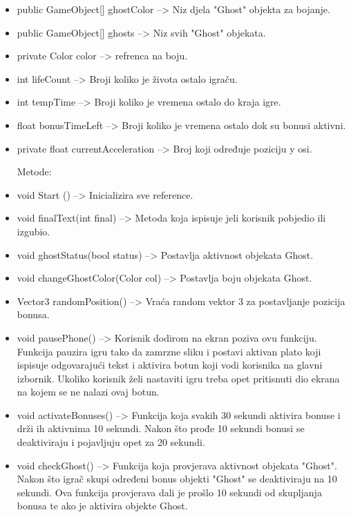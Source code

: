 \begin{itemize}
\item public GameObject[] ghostColor --> Niz djela "Ghost" objekta za bojanje.

\item public GameObject[] ghosts --> Niz svih "Ghost" objekata.
\item private Color color --> refrenca na boju.

\item int lifeCount --> Broji koliko je života ostalo igraču.

\item int tempTime --> Broji koliko je vremena ostalo do kraja igre.

\item float bonusTimeLeft --> Broji koliko je vremena ostalo dok su bonusi aktivni.

\item private float currentAcceleration --> Broj koji određuje poziciju y osi.

Metode:


\item void Start () --> Inicializira sve reference.

\item void finalText(int final) --> Metoda koja ispisuje jeli korisnik pobjedio ili izgubio.

\item void ghostStatus(bool status) --> Postavlja aktivnost objekata Ghost.

\item void changeGhostColor(Color col) --> Postavlja boju objekata Ghost.

\item Vector3 randomPosition() --> Vraća random vektor 3 za postavljanje pozicija bonusa.

\item void pausePhone() --> Korisnik dodirom na ekran poziva ovu funkciju. Funkcija pauzira igru tako da zamrzne sliku i postavi aktivan plato koji ispisuje odgovarajući tekst i aktivira botun koji vodi korisnika na glavni izbornik. Ukoliko korisnik želi nastaviti igru treba opet pritisnuti dio ekrana na kojem se ne nalazi ovaj botun. 

\item void activateBonuses() --> Funkcija koja svakih 30 sekundi aktivira bonuse i drži ih aktivnima 10 sekundi. Nakon što prođe 10 sekundi bonusi se deaktiviraju i pojavljuju opet za 20 sekundi.

\item void checkGhost() --> Funkcija koja provjerava aktivnost objekata "Ghost". Nakon što igrač skupi određeni bonus objekti "Ghost" se deaktiviraju na 10 sekundi. Ova funkcija provjerava dali je prošlo 10 sekundi od skupljanja bonusa te ako je aktivira objekte Ghost.


\end{itemize}
